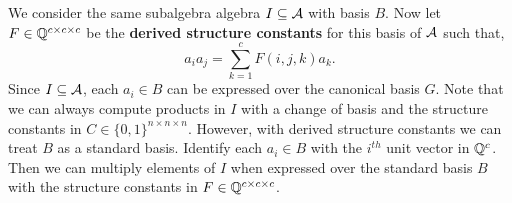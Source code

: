 \documentclass[../thesis.tex]{subfiles}
\begin{document}
We consider the same subalgebra algebra $I\subseteq\mathcal{A}$ with basis $B$. Now let $F\in\mathbb{Q}^{c\times c\times c}$ be the \textbf{derived structure constants} for this basis of $\mathcal{A}$ such that,
\begin{equation*}
    a_ia_j = \sum_{k=1}^c F(i,j,k)a_k.
\end{equation*}
Since $I\subseteq\mathcal{A}$, each $a_i\in B$ can be expressed over the canonical basis $G.$ Note that we can always compute products in $I$ with a change of basis and the structure constants in $C\in\{0,1\}^{n\times n\times n}$. However, with derived structure constants we can treat $B$ as a standard basis. Identify each $a_i\in B$ with the $i^{th}$ unit vector in $\mathbb{Q}^{c}$. Then we can multiply elements of $I$ when expressed over the standard basis $B$ with the structure constants in $F\in\mathbb{Q}^{c\times c\times c}$.
\end{document}
